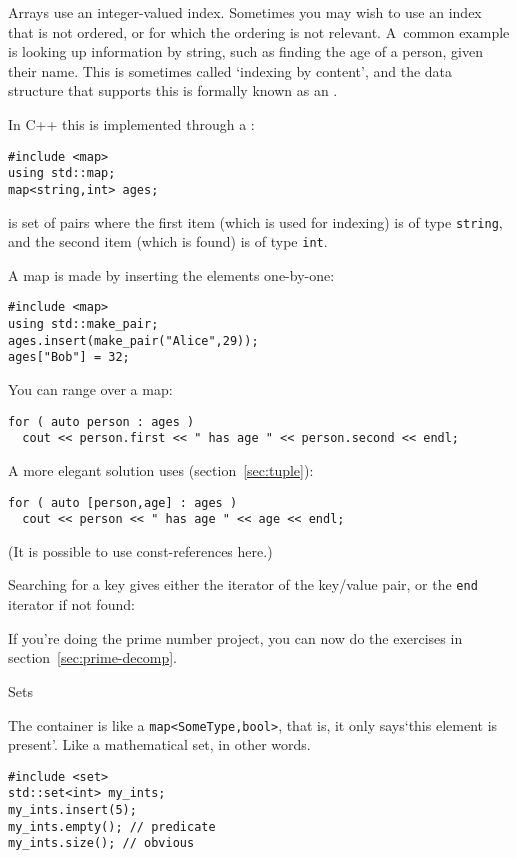 Arrays use an integer-valued index. Sometimes you may wish to use an
index that is not ordered, or for which the ordering is not relevant.
A~common example is looking up information by string, such as finding
the age of a person, given their name. This is sometimes called
`indexing by content', and the data structure that supports this is
formally known as an .

In C++ this is implemented through a :
\begin{lstlisting}
#include <map>
using std::map;
map<string,int> ages;
\end{lstlisting}
is set of
pairs where the first item (which is used for indexing) is of type
\lstinline{string}, and the second item (which is found) is of type \lstinline{int}.

A map is made by inserting the elements one-by-one:
\begin{lstlisting}
#include <map>
using std::make_pair;
ages.insert(make_pair("Alice",29));
ages["Bob"] = 32;
\end{lstlisting}

You can range over a map:
\begin{lstlisting}
for ( auto person : ages )
  cout << person.first << " has age " << person.second << endl;
\end{lstlisting}
A more elegant solution uses
 (section~\ref{sec:tuple}):
\begin{lstlisting}
for ( auto [person,age] : ages )
  cout << person << " has age " << age << endl;
\end{lstlisting}
(It is possible to use const-references here.)

Searching for a key gives either the iterator of the key/value pair,
or the \lstinline{end} iterator if not found:
%

\begin{exercise}
  If you're doing the prime number project, you can now do
  the exercises in section~\ref{sec:prime-decomp}.
\end{exercise}

 {Sets}
\label{sec:stdset}

The  container is like a \lstinline+map<SomeType,bool>+,
that is, it only says`this element is present'.
Like a mathematical set, in other words.

\begin{lstlisting}
#include <set>
std::set<int> my_ints;
my_ints.insert(5);
my_ints.empty(); // predicate
my_ints.size(); // obvious
\end{lstlisting}

